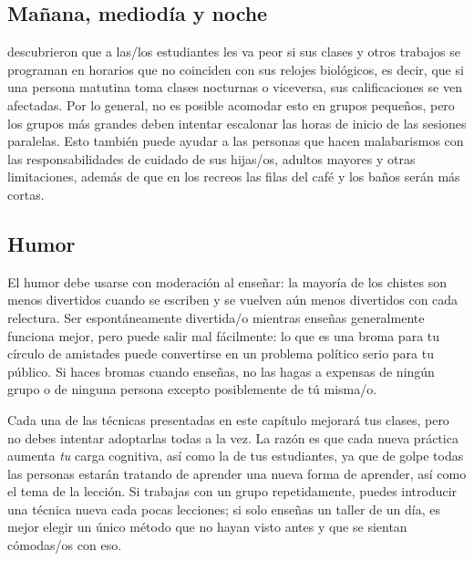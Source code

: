 \subsection*{Mañana, mediodía y noche}

\cite{Smar2018} descubrieron que
a las/los estudiantes les va peor
si sus clases y otros trabajos se programan en horarios que no coinciden con sus relojes biológicos,
es decir, que si una persona matutina toma clases nocturnas o viceversa,
sus calificaciones se ven afectadas.
Por lo general, no es posible acomodar esto en grupos pequeños,
pero los grupos más grandes deben intentar escalonar las horas de inicio de las sesiones paralelas.
Esto también puede ayudar a las personas que hacen malabarismos con las responsabilidades de cuidado de sus hijas/os, adultos mayores y otras limitaciones,
además de que en los recreos las filas del café y los baños serán más cortas.

\subsection*{Humor}

El humor debe usarse con moderación al enseñar:
la mayoría de los chistes son menos divertidos cuando se escriben
y se vuelven aún menos divertidos con cada relectura.
Ser espontáneamente divertida/o mientras enseñas generalmente funciona mejor,
pero puede salir mal fácilmente:
lo que es una broma para tu círculo de amistades
puede convertirse en un problema político serio para tu público.
Si haces bromas cuando enseñas,
no las hagas a expensas de ningún grupo
o de ninguna persona excepto posiblemente de tú misma/o.


Cada una de las técnicas presentadas en este capítulo mejorará tus clases,
pero no debes intentar adoptarlas todas a la vez.
La razón es que cada nueva práctica aumenta \emph{tu} carga cognitiva, así como la de tus estudiantes,
ya que de golpe todas las personas estarán tratando de aprender una nueva forma de aprender,
así como el tema de la lección.
Si trabajas con un grupo repetidamente,
puedes introducir una técnica nueva cada pocas lecciones;
si solo enseñas un taller de un día,
es mejor elegir un único método que no hayan visto antes
y que se sientan cómodas/os con eso.



